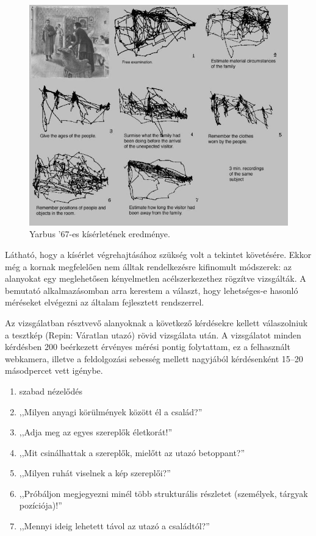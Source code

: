 \begin{figure}[!ht]
\centering
\includegraphics[width=140mm, keepaspectratio]{figures/yarbus.jpg}
\caption{Yarbus '67-es kísérletének eredménye.}
\label{fig:yarbus}
\end{figure}

Látható, hogy a kísérlet végrehajtásához szükség volt a tekintet követésére. Ekkor még a kornak megfelelően nem álltak rendelkezésre kifinomult módszerek: az alanyokat egy meglehetősen kényelmetlen acélszerkezethez rögzítve vizsgálták. A bemutató alkalmazásomban arra kerestem a választ, hogy lehetséges-e hasonló méréseket elvégezni az általam fejlesztett rendszerrel.

\bigskip

Az vizsgálatban résztvevő alanyoknak a következő kérdésekre kellett válaszolniuk a tesztkép (Repin: Váratlan utazó) rövid vizsgálata után. A vizsgálatot minden kérdésben 200 beérkezett érvényes mérési pontig folytattam, ez a felhasznált webkamera, illetve a feldolgozási sebesség mellett nagyjából kérdésenként 15--20 másodpercet vett igénybe.

\begin{enumerate}
 \item szabad nézelődés
 \item ,,Milyen anyagi körülmények között él a család?''
 \item ,,Adja meg az egyes szereplők életkorát!''
 \item ,,Mit csinálhattak a szereplők, mielőtt az utazó betoppant?''
 \item ,,Milyen ruhát viselnek a kép szereplői?''
 \item ,,Próbáljon megjegyezni minél több strukturális részletet (személyek, tárgyak pozíciója)!''
 \item ,,Mennyi ideig lehetett távol az utazó a családtól?''
\end{enumerate}

